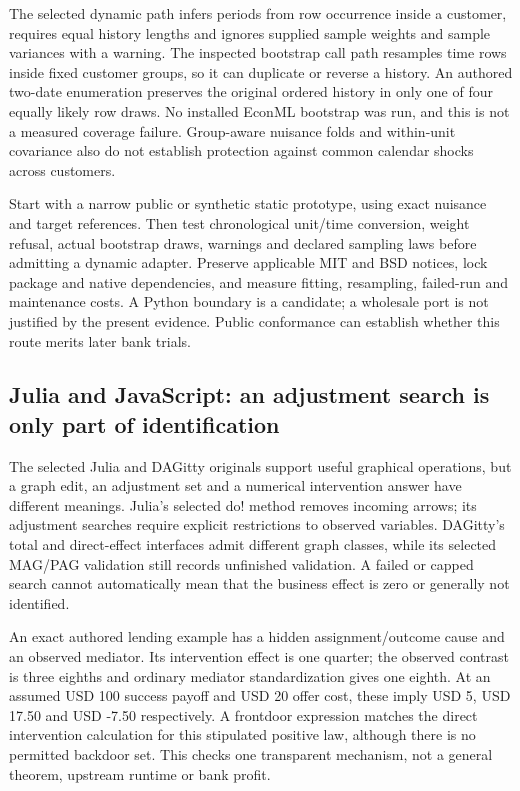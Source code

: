 The selected dynamic path infers periods from row occurrence inside a
customer, requires equal history lengths and ignores supplied sample
weights and sample variances with a warning. The inspected bootstrap
call path resamples time rows inside fixed customer groups, so it can
duplicate or reverse a history. An authored two-date enumeration
preserves the original ordered history in only one of four equally
likely row draws. No installed EconML bootstrap was run, and this is not
a measured coverage failure. Group-aware nuisance folds and within-unit
covariance also do not establish protection against common calendar
shocks across customers.
\citep{exec19_econml_source,exec19_econml_reference}

Start with a narrow public or synthetic static prototype, using exact
nuisance and target references. Then test chronological unit/time
conversion, weight refusal, actual bootstrap draws, warnings and
declared sampling laws before admitting a dynamic adapter. Preserve
applicable MIT and BSD notices, lock package and native dependencies,
and measure fitting, resampling, failed-run and maintenance costs. A
Python boundary is a candidate; a wholesale port is not justified by the
present evidence. Public conformance can establish whether this route
merits later bank trials. \citep{exec19_econml_source}

\hypertarget{julia-and-javascript-an-adjustment-search-is-only-part-of-identification}{%
\subsection{Julia and JavaScript: an adjustment search is only part of
identification}\label{julia-and-javascript-an-adjustment-search-is-only-part-of-identification}}

The selected Julia and DAGitty originals support useful graphical
operations, but a graph edit, an adjustment set and a numerical
intervention answer have different meanings. Julia's selected do! method
removes incoming arrows; its adjustment searches require explicit
restrictions to observed variables. DAGitty's total and direct-effect
interfaces admit different graph classes, while its selected MAG/PAG
validation still records unfinished validation. A failed or capped
search cannot automatically mean that the business effect is zero or
generally not identified.
\citep{exec19_otherid_julia,exec19_otherid_dagitty}

An exact authored lending example has a hidden assignment/outcome cause
and an observed mediator. Its intervention effect is one quarter; the
observed contrast is three eighths and ordinary mediator standardization
gives one eighth. At an assumed USD 100 success payoff and USD 20 offer
cost, these imply USD 5, USD 17.50 and USD -7.50 respectively. A
frontdoor expression matches the direct intervention calculation for
this stipulated positive law, although there is no permitted backdoor
set. This checks one transparent mechanism, not a general theorem,
upstream runtime or bank profit. \citep{exec19_otherid_reference}

